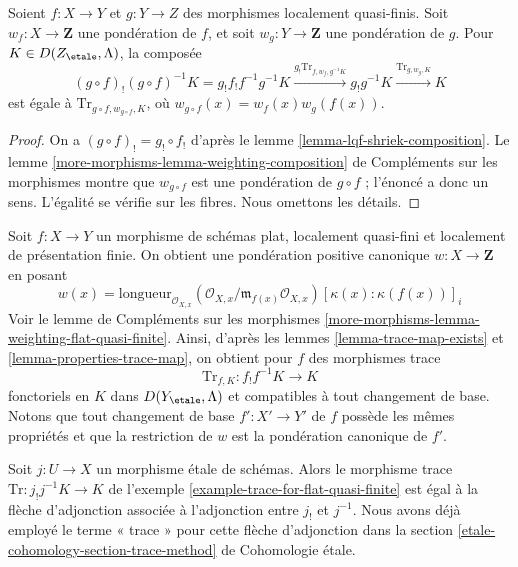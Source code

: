 \begin{lemma}
\label{lemma-trace-composition}
Soient $f : X \to Y$ et $g : Y \to Z$ des morphismes localement quasi-finis.
Soit $w_f : X \to \mathbf{Z}$ une pondération de $f$, et soit
$w_g : Y \to \mathbf{Z}$ une pondération de $g$. Pour
$K \in D(Z_\etale, \Lambda)$, la composée
$$
(g \circ f)_!(g \circ f)^{-1}K =
g_! f_! f^{-1} g^{-1}K
\xrightarrow{g_! \text{Tr}_{f, w_f, g^{-1}K}}
g_!g^{-1}K
\xrightarrow{\text{Tr}_{g, w_g, K}}
K
$$
est égale à $\text{Tr}_{g \circ f, w_{g \circ f}, K}$, où
$w_{g \circ f}(x) = w_f(x) w_g(f(x))$.
\end{lemma}

\begin{proof}
On a $(g \circ f)_! = g_! \circ f_!$ d'après le
lemme \ref{lemma-lqf-shriek-composition}.
Le lemme \ref{more-morphisms-lemma-weighting-composition} de Compléments sur les morphismes
montre que $w_{g \circ f}$ est une pondération de $g \circ f$ ;
l'énoncé a donc un sens. L'égalité se vérifie sur les fibres.
Nous omettons les détails.
\end{proof}

\begin{example}
\label{example-trace-for-flat-quasi-finite}
Soit $f : X \to Y$ un morphisme de schémas plat,
localement quasi-fini et localement de présentation finie.
On obtient une pondération positive canonique $w : X \to \mathbf{Z}$
en posant
$$
w(x) = \text{longueur}_{\mathcal{O}_{X, x}}
(\mathcal{O}_{X, x}/\mathfrak m_{f(x)} \mathcal{O}_{X, x})
[\kappa(x) : \kappa(f(x))]_i
$$
Voir le lemme de Compléments sur les morphismes
\ref{more-morphisms-lemma-weighting-flat-quasi-finite}.
Ainsi, d'après les lemmes \ref{lemma-trace-map-exists} et
\ref{lemma-properties-trace-map}, on obtient pour $f$ des morphismes trace
$$
\text{Tr}_{f, K} : f_!f^{-1}K \longrightarrow K
$$
fonctoriels en $K$ dans $D(Y_\etale, \Lambda)$ et compatibles
à tout changement de base. Notons que tout changement de base
$f' : X' \to Y'$ de $f$ possède les mêmes propriétés et que la restriction de $w$
est la pondération canonique de $f'$.
\end{example}

\begin{remark}
\label{remark-trace-etale-counit}
Soit $j : U \to X$ un morphisme étale de schémas. Alors le morphisme trace
$\text{Tr} : j_!j^{-1}K \to K$ de
l'exemple \ref{example-trace-for-flat-quasi-finite} est égal à la
flèche d'adjonction associée à l'adjonction entre $j_!$ et $j^{-1}$.
Nous avons déjà employé le terme « trace » pour cette flèche d'adjonction dans la
section \ref{etale-cohomology-section-trace-method} de Cohomologie étale.
\end{remark}

